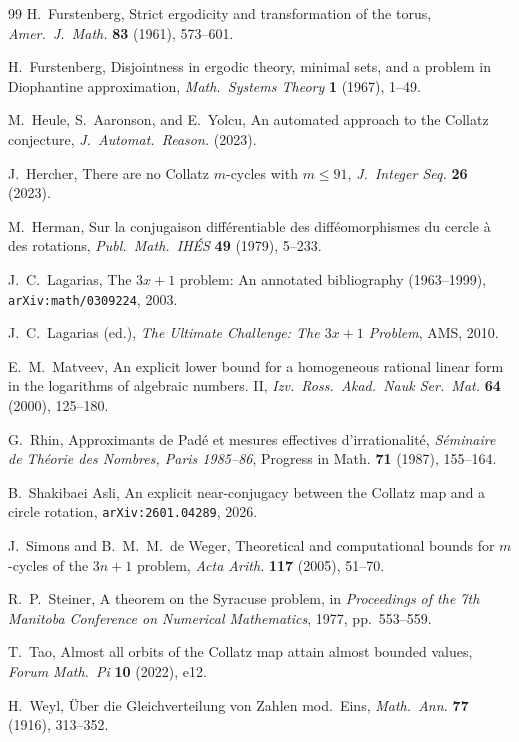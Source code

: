 \documentclass{CUP-JNL-FMP}%
\theoremstyle{definition}
\numberwithin{equation}{section}
\begin{document}
\begin{Backmatter}
\begin{thebibliography}{99}
H.~Furstenberg, Strict ergodicity and transformation of the torus,
\emph{Amer.\ J.\ Math.} \textbf{83} (1961), 573--601.

H.~Furstenberg, Disjointness in ergodic theory, minimal sets, and a problem
in Diophantine approximation, \emph{Math.\ Systems Theory} \textbf{1} (1967),
1--49.

M.~Heule, S.~Aaronson, and E.~Yolcu, An automated approach to the Collatz
conjecture, \emph{J.\ Automat.\ Reason.} (2023).

J.~Hercher, There are no Collatz $m$-cycles with $m \leq 91$,
\emph{J.\ Integer Seq.} \textbf{26} (2023).

M.~Herman, Sur la conjugaison diff\'erentiable des diff\'eomorphismes du cercle
\`a des rotations, \emph{Publ.\ Math.\ IH\'ES} \textbf{49} (1979), 5--233.

J.~C.~Lagarias, The $3x+1$ problem: An annotated bibliography (1963--1999),
\texttt{arXiv:math/0309224}, 2003.

J.~C.~Lagarias (ed.), \emph{The Ultimate Challenge: The $3x+1$ Problem},
AMS, 2010.

E.~M.~Matveev, An explicit lower bound for a homogeneous rational linear form
in the logarithms of algebraic numbers. II, \emph{Izv.\ Ross.\ Akad.\ Nauk
Ser.\ Mat.} \textbf{64} (2000), 125--180.

G.~Rhin, Approximants de Pad\'e et mesures effectives d'irrationalit\'e,
\emph{S\'eminaire de Th\'eorie des Nombres, Paris 1985--86}, Progress in Math.
\textbf{71} (1987), 155--164.

B.~Shakibaei Asli, An explicit near-conjugacy between the Collatz map and a
circle rotation, \texttt{arXiv:2601.04289}, 2026.

J.~Simons and B.~M.~M.~de Weger, Theoretical and computational bounds for
$m$-cycles of the $3n+1$ problem, \emph{Acta Arith.} \textbf{117} (2005),
51--70.

R.~P.~Steiner, A theorem on the Syracuse problem, in \emph{Proceedings of the
7th Manitoba Conference on Numerical Mathematics}, 1977, pp.~553--559.

T.~Tao, Almost all orbits of the Collatz map attain almost bounded values,
\emph{Forum Math.\ Pi} \textbf{10} (2022), e12.

H.~Weyl, \"Uber die Gleichverteilung von Zahlen mod.\ Eins,
\emph{Math.\ Ann.} \textbf{77} (1916), 313--352.

\end{thebibliography}

\end{Backmatter}
\end{document}
